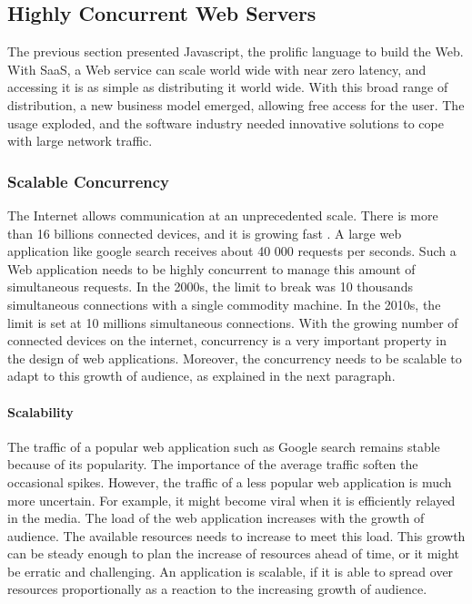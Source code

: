 \subsection{Highly Concurrent Web Servers}

The previous section presented Javascript, the prolific language to build the Web.
With SaaS, a Web service can scale world wide with near zero latency, and accessing it is as simple as distributing it world wide.
With this broad range of distribution, a new business model emerged, allowing free access for the user.
The usage exploded, and the software industry needed innovative solutions to cope with large network traffic.

\subsubsection{Scalable Concurrency}

The Internet allows communication at an unprecedented scale.
There is more than 16 billions connected devices, and it is growing fast \cite{Hilbert2011}.
A large web application like google search receives about 40 000 requests per seconds.
Such a Web application needs to be highly concurrent to manage this amount of simultaneous requests.
In the 2000s, the limit to break was 10 thousands simultaneous connections with a single commodity machine.
In the 2010s, the limit is set at 10 millions simultaneous connections.
With the growing number of connected devices on the internet, concurrency is a very important property in the design of web applications.
Moreover, the concurrency needs to be scalable to adapt to this growth of audience, as explained in the next paragraph.

\paragraph{Scalability}

The traffic of a popular web application such as Google search remains stable because of its popularity.
The importance of the average traffic soften the occasional spikes.
However, the traffic of a less popular web application is much more uncertain.
For example, it might become viral when it is efficiently relayed in the media.
The load of the web application increases with the growth of audience.
The available resources needs to increase to meet this load.
This growth can be steady enough to plan the increase of resources ahead of time, or it might be erratic and challenging.
An application is scalable, if it is able to spread over resources proportionally as a reaction to the increasing growth of audience.

